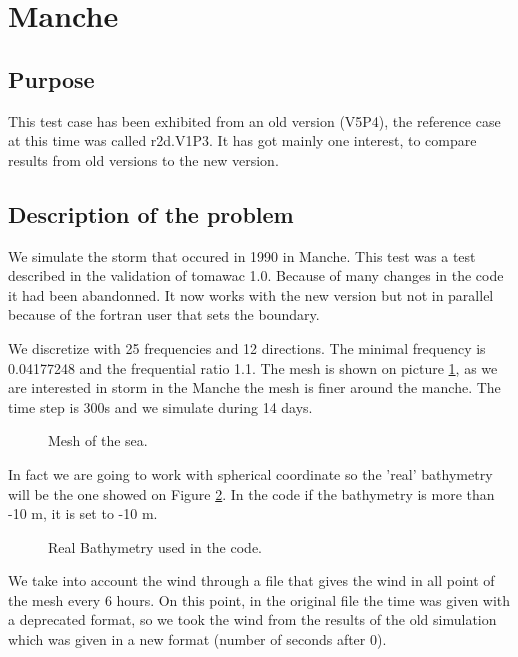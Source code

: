 \section{Manche}
%
%
\subsection{Purpose}
%
This test case has been exhibited from an old version (V5P4), the reference case at this time was called r2d.V1P3. It has got mainly one interest, to compare results from old versions to the new version.  

%
\subsection{Description of the problem}
We simulate the storm that occured in 1990 in Manche. This test was a test described in the validation of tomawac 1.0. Because of many changes in the code it had been abandonned. It now works with the new version but not in parallel because of the fortran user that sets the boundary. 

We discretize with 25 frequencies and 12 directions. The minimal frequency is 0.04177248 and the frequential ratio 1.1.
The mesh is shown on picture \ref{figmanchemesh}, as we are interested in storm in the Manche the mesh is finer around the manche. 
The time step is 300s and we simulate during 14 days. 
\begin{figure} [!h]
\centering
{}
 \caption{Mesh of the sea. }
\label{figmanchemesh}
\end{figure}

In fact we are going to work with spherical coordinate so the 'real' bathymetry will be the one showed on Figure \ref{realbathymanche}. In the code if the bathymetry is more than -10 m, it is set to -10 m.
\begin{figure} [!h]
\centering
{}
 \caption{Real Bathymetry used in the code.}
\label{realbathymanche}
\end{figure}

We take into account the wind through a file that gives the wind in all point of the mesh every 6 hours. On this point, in the original file the time was given with a deprecated format, so we took the wind from the results of the old simulation which was given in a new format (number of seconds after 0).

